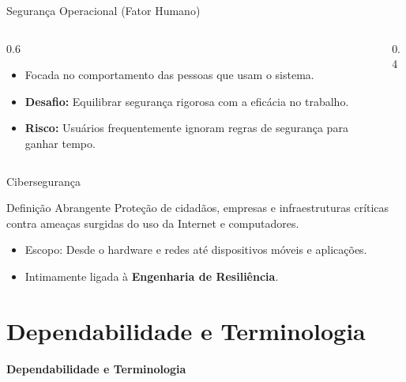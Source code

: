 \documentclass[aspectratio=169]{beamer}
\begin{document}
\begin{frame}{Segurança Operacional (Fator Humano)}
    \begin{columns}
        \begin{column}{0.6\textwidth}
            \begin{itemize}
                \item Focada no comportamento das pessoas que usam o sistema.
                \item \textbf{Desafio:} Equilibrar segurança rigorosa com a eficácia no trabalho.
                \item \textbf{Risco:} Usuários frequentemente ignoram regras de segurança para ganhar tempo.
            \end{itemize}
        \end{column}
        \begin{column}{0.4\textwidth}
            \centering
        \end{column}
    \end{columns}
\end{frame}

\begin{frame}{Cibersegurança}
    \begin{block}{Definição Abrangente}
        Proteção de cidadãos, empresas e infraestruturas críticas contra ameaças surgidas do uso da Internet e computadores.
    \end{block}
    \vspace{0.5cm}
    \begin{itemize}
        \item Escopo: Desde o hardware e redes até dispositivos móveis e aplicações.
        \item Intimamente ligada à \textbf{Engenharia de Resiliência}.
    \end{itemize}
\end{frame}

\section{Dependabilidade e Terminologia}
{
\begin{frame}[plain]
    \centering
    \Huge \color{white} \bfseries Dependabilidade e Terminologia
\end{frame}
}
\end{document}
